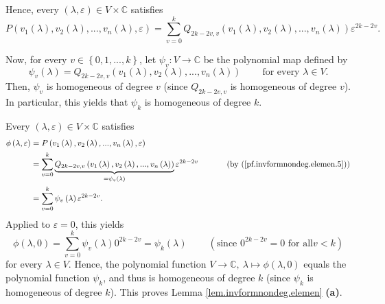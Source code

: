 \documentclass
[numbers=enddot,12pt,final,onecolumn,german,notitlepage]{scrartcl}%
\theoremstyle{definition}
\begin{document}
Hence, every $\left(  \lambda,\varepsilon\right)  \in V\times\mathbb{C}$
satisfies%
\begin{equation}
P\left(  v_{1}\left(  \lambda\right)  ,v_{2}\left(  \lambda\right)
,...,v_{n}\left(  \lambda\right)  ,\varepsilon\right)  =\sum\limits_{v=0}%
^{k}Q_{2k-2v,v}\left(  v_{1}\left(  \lambda\right)  ,v_{2}\left(
\lambda\right)  ,...,v_{n}\left(  \lambda\right)  \right)  \varepsilon
^{2k-2v}.\label{pf.invformnondeg.elemen.5}%
\end{equation}


Now, for every $v\in\left\{  0,1,...,k\right\}  $, let $\psi_{v}%
:V\rightarrow\mathbb{C}$ be the polynomial map defined by%
\[
\psi_{v}\left(  \lambda\right)  =Q_{2k-2v,v}\left(  v_{1}\left(
\lambda\right)  ,v_{2}\left(  \lambda\right)  ,...,v_{n}\left(  \lambda
\right)  \right)  \ \ \ \ \ \ \ \ \ \ \text{for every }\lambda\in V.
\]
Then, $\psi_{v}$ is homogeneous of degree $v$ (since $Q_{2k-2v,v}$ is
homogeneous of degree $v$). In particular, this yields that $\psi_{k}$ is
homogeneous of degree $k$.

Every $\left(  \lambda,\varepsilon\right)  \in V\times\mathbb{C}$ satisfies%
\begin{align}
\phi\left(  \lambda,\varepsilon\right)    & =P\left(  v_{1}\left(
\lambda\right)  ,v_{2}\left(  \lambda\right)  ,...,v_{n}\left(  \lambda
\right)  ,\varepsilon\right)  \nonumber\\
& =\sum\limits_{v=0}^{k}\underbrace{Q_{2k-2v,v}\left(  v_{1}\left(
\lambda\right)  ,v_{2}\left(  \lambda\right)  ,...,v_{n}\left(  \lambda
\right)  \right)  }_{=\psi_{v}\left(  \lambda\right)  }\varepsilon
^{2k-2v}\ \ \ \ \ \ \ \ \ \ \left(  \text{by (\ref{pf.invformnondeg.elemen.5}%
)}\right)  \nonumber\\
& =\sum\limits_{v=0}^{k}\psi_{v}\left(  \lambda\right)  \varepsilon
^{2k-2v}.\label{pf.invformnondeg.elemen.10}%
\end{align}
Applied to $\varepsilon=0$, this yields%
\[
\phi\left(  \lambda,0\right)  =\sum\limits_{v=0}^{k}\psi_{v}\left(
\lambda\right)  0^{2k-2v}=\psi_{k}\left(  \lambda\right)
\ \ \ \ \ \ \ \ \ \ \left(  \text{since }0^{2k-2v}=0\text{ for all
}v<k\right)
\]
for every $\lambda\in V$. Hence, the polynomial function $V\rightarrow
\mathbb{C},\ \lambda\mapsto\phi\left(  \lambda,0\right)  $ equals the
polynomial function $\psi_{k}$, and thus is homogeneous of degree $k$ (since
$\psi_{k}$ is homogeneous of degree $k$). This proves Lemma
\ref{lem.invformnondeg.elemen} \textbf{(a)}.
\end{document}
